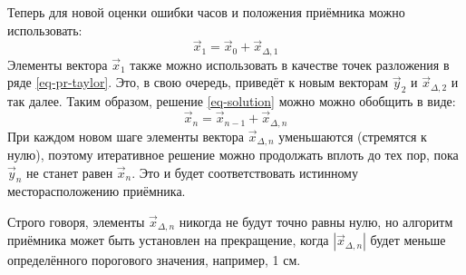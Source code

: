 Теперь для новой оценки ошибки часов и положения приёмника можно использовать:
\begin{equation}
\label{eq-solution}
\vec{x}_1=\vec{x}_0+\vec{x}_{\Delta,1}    
\end{equation}
Элементы вектора $\vec{x}_1$ также можно использовать в качестве точек разложения в ряде \eqref{eq-pr-taylor}.
Это, в свою очередь, приведёт к новым векторам $\vec{y}_2$ и $\vec{x}_{\Delta,2}$ и так далее.   
Таким образом, решение \eqref{eq-solution} можно можно обобщить в виде:
\begin{equation}
\vec{x}_n=\vec{x}_{n-1}+\vec{x}_{\Delta,n}    
\end{equation}
При каждом новом шаге элементы вектора $\vec{x}_{\Delta,n}$ уменьшаются (стремятся к нулю), поэтому итеративное решение можно продолжать вплоть до тех пор, пока $\vec{y}_n$ не станет равен $\vec{x}_n$. 
Это и будет соответствовать истинному месторасположению приёмника.

Строго говоря, элементы $\vec{x}_{\Delta,n}$ никогда не будут точно равны нулю, но алгоритм приёмника может быть установлен на прекращение, когда $|\vec{x}_{\Delta,n}|$ будет меньше определённого порогового значения, например, 1 см. 